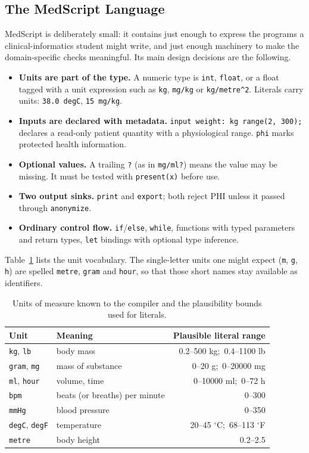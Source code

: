 \documentclass[conference]{IEEEtran}
\newcommand{\code}[1]{\texttt{#1}}
\providecommand{\textasciicircum}{\^{}}
\begin{document}
\subsection{The MedScript Language}

MedScript is deliberately small: it contains just enough to express the programs a clinical-informatics student
might write, and just enough machinery to make the domain-specific checks meaningful. Its main design decisions
are the following.

\begin{itemize}
    \item \textbf{Units are part of the type.} A numeric type is \code{int}, \code{float}, or a float tagged with a
    unit expression such as \code{kg}, \code{mg/kg} or \code{kg/metre\textasciicircum 2}. Literals carry units:
    \code{38.0 degC}, \code{15 mg/kg}.
    \item \textbf{Inputs are declared with metadata.} \code{input weight: kg range(2, 300);} declares a read-only
    patient quantity with a physiological range. \code{phi} marks protected health information.
    \item \textbf{Optional values.} A trailing \code{?} (as in \code{mg/ml?}) means the value may be missing. It
    must be tested with \code{present(x)} before use.
    \item \textbf{Two output sinks.} \code{print} and \code{export}; both reject PHI unless it passed through
    \code{anonymize}.
    \item \textbf{Ordinary control flow.} \code{if}/\code{else}, \code{while}, functions with typed parameters and
    return types, \code{let} bindings with optional type inference.
\end{itemize}

Table~\ref{tab:units} lists the unit vocabulary. The single-letter units one might expect (\code{m}, \code{g},
\code{h}) are spelled \code{metre}, \code{gram} and \code{hour}, so that those short names stay available as
identifiers.

\begin{table}[t]
\centering
\caption{Units of measure known to the compiler and the plausibility bounds used for literals.}
\label{tab:units}
\footnotesize
\begin{tabular}{llr}
\toprule
\textbf{Unit} & \textbf{Meaning} & \textbf{Plausible literal range}\\
\midrule
\code{kg}, \code{lb} & body mass & 0.2--500 kg;\ 0.4--1100 lb\\
\code{gram}, \code{mg} & mass of substance & 0--20 g;\ 0--20000 mg\\
\code{ml}, \code{hour} & volume, time & 0--10000 ml;\ 0--72 h\\
\code{bpm} & beats (or breaths) per minute & 0--300\\
\code{mmHg} & blood pressure & 0--350\\
\code{degC}, \code{degF} & temperature & 20--45 $^\circ$C;\ 68--113 $^\circ$F\\
\code{metre} & body height & 0.2--2.5\\
\bottomrule
\end{tabular}
\end{table}
\end{document}
